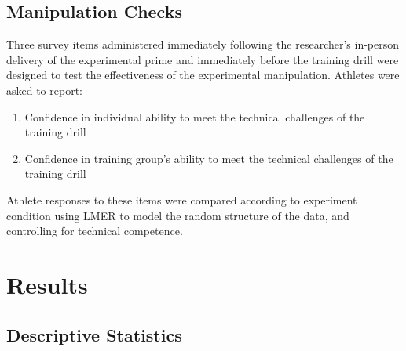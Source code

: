 

\subsection{Manipulation Checks\label{sec:manChecksDrill}}
Three survey items administered immediately following the researcher's in-person delivery of the experimental prime and immediately before the training drill were designed to test the effectiveness of the experimental manipulation.  Athletes were asked to report:

\begin{enumerate}
  \item Confidence in individual ability to meet the technical challenges of the training drill
  \item Confidence in training group's ability to meet the technical challenges of the training drill
\end{enumerate}

Athlete responses to these items were compared according to experiment condition using LMER to model the random structure of the data, and controlling for technical competence.


































\clearpage
\section{Results}


\subsection{Descriptive Statistics \label{sec:descriptives}}

